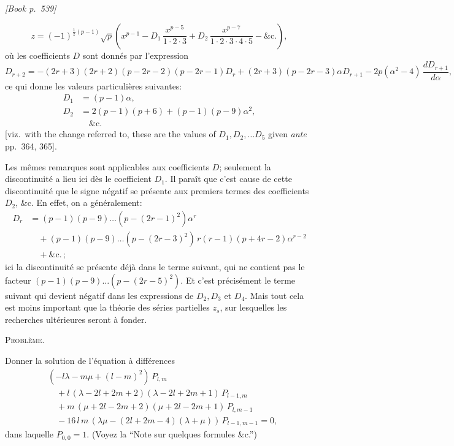 \documentclass[11pt]{article}
\begin{document}
\medskip
\noindent\textit{[Book p.~539]}\hfill

\smallskip

\[
z = (-1)^{\frac{1}{2}(p-1)}\sqrt{p}\left(x^{p-1} - D_{1}\,\frac{x^{p-5}}{1\cdot 2\cdot 3} + D_{2}\,\frac{x^{p-7}}{1\cdot 2\cdot 3\cdot 4\cdot 5} - \&\text{c.}\right),
\]
o\`u les coefficients $D$ sont donn\'es par l'expression
\[
D_{r+2} = -(2r+3)(2r+2)(p-2r-2)(p-2r-1)D_{r} + (2r+3)(p-2r-3)\alpha D_{r+1} - 2p(\alpha^{2} - 4)\,\frac{dD_{r+1}}{d\alpha},
\]
ce qui donne les valeurs particuli\`eres suivantes:
\[
\begin{aligned}
D_{1} &= (p - 1)\alpha,\\
D_{2} &= 2(p - 1)(p + 6) + (p - 1)(p - 9)\alpha^{2},\\
&\quad \&\text{c.}
\end{aligned}
\]
[viz.\ with the change referred to, these are the values of $D_{1}, D_{2}, \dots D_{5}$ given \emph{ante} pp.~364, 365].

Les m\^emes remarques sont applicables aux coefficients $D$; seulement la discontinuit\'e a lieu ici d\`es le coefficient $D_{1}$. Il para\^it que c'est cause de cette discontinuit\'e que le signe n\'egatif se pr\'esente aux premiers termes des coefficients $D_{2}$, \&c. En effet, on a g\'en\'eralement:
\[
\begin{aligned}
D_{r} &= (p - 1)(p - 9)\dots(p - (2r-1)^{2})\alpha^{r}\\
&\quad + (p - 1)(p - 9)\dots(p - (2r-3)^{2})\,r(r-1)(p + 4r - 2)\alpha^{r-2}\\
&\quad + \&\text{c.}\,;
\end{aligned}
\]
ici la discontinuit\'e se pr\'esente d\'ej\`a dans le terme suivant, qui ne contient pas le facteur $(p-1)(p-9)\dots(p-(2r-5)^{2})$. Et c'est pr\'ecis\'ement le terme suivant qui devient n\'egatif dans les expressions de $D_{2}, D_{3}$ et $D_{4}$. Mais tout cela est moins important que la th\'eorie des s\'eries partielles $z_{s}$, sur lesquelles les recherches ult\'erieures seront \`a fonder.

\bigskip

\begin{center}\textsc{Probl\`eme.}\end{center}

Donner la solution de l'\'equation \`a diff\'erences
\[
\begin{aligned}
&(-l\lambda - m\mu + (l - m)^{2})\,P_{l,m}\\
&\quad + l\,(\lambda - 2l + 2m + 2)(\lambda - 2l + 2m + 1)\,P_{l-1,m}\\
&\quad + m\,(\mu + 2l - 2m + 2)(\mu + 2l - 2m + 1)\,P_{l,m-1}\\
&\quad - 16\,l\,m\,(\lambda\mu - (2l + 2m - 4)(\lambda + \mu))\,P_{l-1,m-1} = 0,
\end{aligned}
\]
dans laquelle $P_{0,0} = 1$. (Voyez la ``Note sur quelques formules \&c.'')
\end{document}
